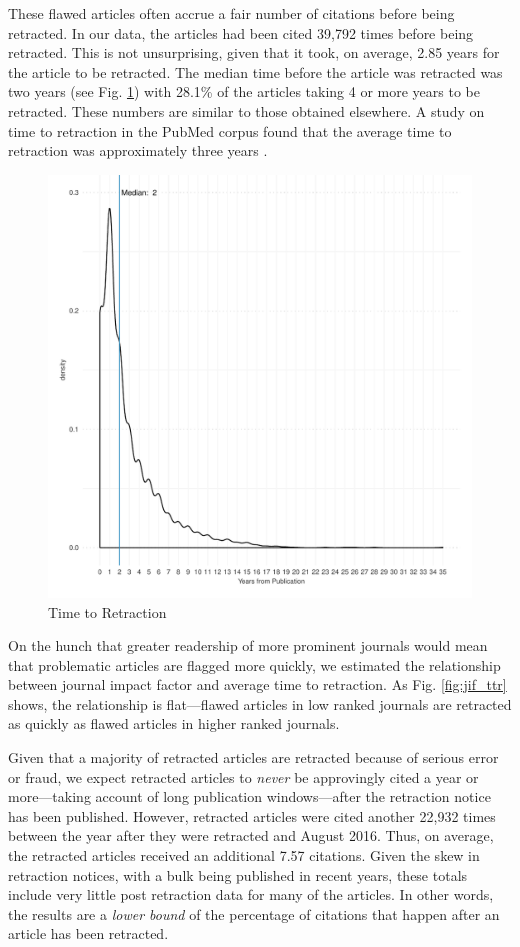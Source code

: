 \documentclass[12pt]{article}
\begin{document}
These flawed articles often accrue a fair number of citations before being retracted. In our data, the articles had been cited 39,792 times before being retracted. This is not unsurprising, given that it took, on average, 2.85 years for the article to be retracted. The median time before the article was retracted was two years (see Fig. \ref{fig:ttr}) with 28.1\% of the articles taking 4 or more years to be retracted. These numbers are similar to those obtained elsewhere. A study on time to retraction in the PubMed corpus found that the average time to retraction was approximately three years  \cite{steen2013has}. 

\begin{figure}[h]
\centering
\includegraphics[scale=.7]{../figs/time_to_retraction.pdf}
\caption{Time to Retraction}
\label{fig:ttr}
\end{figure}

On the hunch that greater readership of more prominent journals would mean that problematic articles are flagged more quickly, we estimated the relationship between journal impact factor and average time to retraction. As Fig. \ref{fig:jif_ttr} shows, the relationship is flat---flawed articles in low ranked journals are retracted as quickly as flawed articles in higher ranked journals.

Given that a majority of retracted articles are retracted because of serious error or fraud, we expect retracted articles to \textit{never} be approvingly cited a year or more---taking account of long publication windows---after the retraction notice has been published. However, retracted articles were cited another 22,932 times between the year after they were retracted and August 2016. Thus, on average, the retracted articles received an additional 7.57 citations. Given the skew in retraction notices, with a bulk being published in recent years, these totals include very little post retraction data for many of the articles. In other words, the results are a \textit{lower bound} of the percentage of citations that happen after an article has been retracted.
\end{document}
